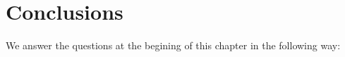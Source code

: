 




\section{Conclusions}
We  answer  the questions  at  the begining  of  this  chapter in  the
following way:


